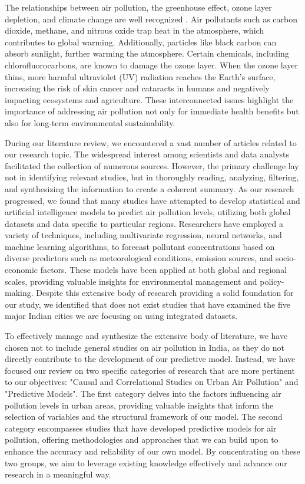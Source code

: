 \documentclass[twoside,11pt]{article}
\begin{document}
The relationships between air pollution, the greenhouse effect, ozone layer depletion, and climate change are well recognized \citep{manisalidis2020environmental}. Air pollutants such as carbon dioxide, methane, and nitrous oxide trap heat in the atmosphere, which contributes to global warming. Additionally, particles like black carbon can absorb sunlight, further warming the atmosphere. Certain chemicals, including chlorofluorocarbons, are known to damage the ozone layer. When the ozone layer thins, more harmful ultraviolet (UV) radiation reaches the Earth's surface, increasing the risk of skin cancer and cataracts in humans and negatively impacting ecosystems and agriculture. These interconnected issues highlight the importance of addressing air pollution not only for immediate health benefits but also for long-term environmental sustainability.

During our literature review, we encountered a vast number of articles related to our research topic. The widespread interest among scientists and data analysts facilitated the collection of numerous sources. However, the primary challenge lay not in identifying relevant studies, but in thoroughly reading, analyzing, filtering, and synthesizing the information to create a coherent summary. As our research progressed, we found that many studies have attempted to develop statistical and artificial intelligence models to predict air pollution levels, utilizing both global datasets and data specific to particular regions. Researchers have employed a variety of techniques, including multivariate regression, neural networks, and machine learning algorithms, to forecast pollutant concentrations based on diverse predictors such as meteorological conditions, emission sources, and socio-economic factors. These models have been applied at both global and regional scales, providing valuable insights for environmental management and policy-making. Despite this extensive body of research providing a solid foundation for our study, we identified that does not exist studies that have examined the five major Indian cities we are focusing on using integrated datasets.

To effectively manage and synthesize the extensive body of literature, we have chosen not to include general studies on air pollution in India, as they do not directly contribute to the development of our predictive model. Instead, we have focused our review on two specific categories of research that are more pertinent to our objectives: "Causal and Correlational Studies on Urban Air Pollution" and "Predictive Models". The first category delves into the factors influencing air pollution levels in urban areas, providing valuable insights that inform the selection of variables and the structural framework of our model. The second category encompasses studies that have developed predictive models for air pollution, offering methodologies and approaches that we can build upon to enhance the accuracy and reliability of our own model. By concentrating on these two groups, we aim to leverage existing knowledge effectively and advance our research in a meaningful way.
\end{document}
